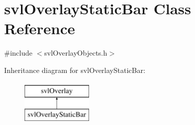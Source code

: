 \hypertarget{classsvl_overlay_static_bar}{\section{svl\-Overlay\-Static\-Bar Class Reference}
\label{classsvl_overlay_static_bar}
}


{\ttfamily \#include $<$svl\-Overlay\-Objects.\-h$>$}

Inheritance diagram for svl\-Overlay\-Static\-Bar\-:\begin{figure}[H]
\begin{center}
\leavevmode
\includegraphics[height=2.000000cm]{d2/d53/classsvl_overlay_static_bar}
\end{center}
\end{figure}
